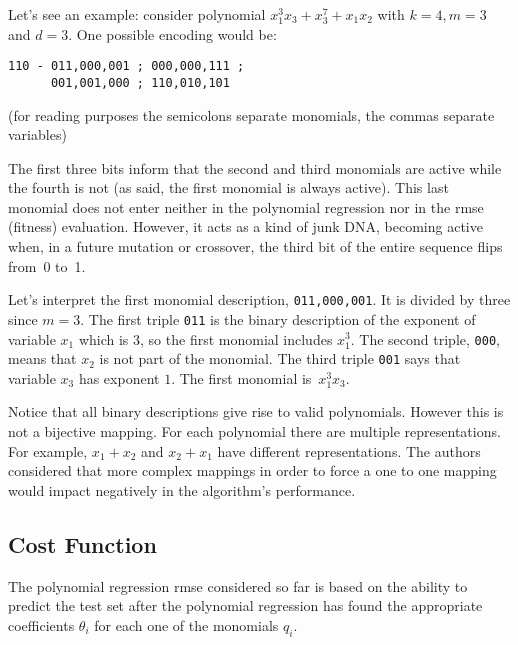 \documentclass[final,authoryear,3p,times,twocolumn]{elsarticle}
\begin{document}
Let's see an example: consider polynomial $x_1^3 x_3 + x_3^7 + x_1 x_2$ with $k = 4, m = 3$ and $d=3$. One possible encoding would be:
\begin{verbatim}
110 - 011,000,001 ; 000,000,111 ;
      001,001,000 ; 110,010,101
\end{verbatim}


(for reading purposes the semicolons separate monomials, the commas separate variables)

The first three bits inform that the second and third monomials are active while the fourth is not (as said, the first monomial is always active). This last monomial does not enter neither in the polynomial regression nor in the \ac{rmse} (fitness) evaluation. However, it acts as a kind of junk DNA, becoming active when, in a future mutation or crossover, the third bit of the entire sequence flips from~0 to~1.

Let's interpret the first monomial description, \verb!011,000,001!. It is divided by three since $m=3$. The first triple \verb!011! is the binary description of the exponent of variable $x_1$ which is 3, so the first monomial includes $x_1^3$. The second triple, \verb!000!, means that $x_2$ is not part of the monomial. The third triple \verb!001! says that variable $x_3$ has exponent $1$. The first monomial is~$x_1^3 x_3$.

Notice that all binary descriptions give rise to valid polynomials. However this is not a bijective mapping. For each polynomial there are multiple representations. For example, $x_1+x_2$ and $x_2+x_1$ have different representations. The authors considered that more complex mappings in order to force a one to one mapping would impact negatively in the algorithm's performance.


\subsection{Cost Function}\label{subs:cost.function}

The polynomial regression \ac{rmse} considered so far is based on the ability to predict the test set after the polynomial regression has found the appropriate coefficients $\theta_i$ for each one of the monomials $q_i$.
\end{document}

